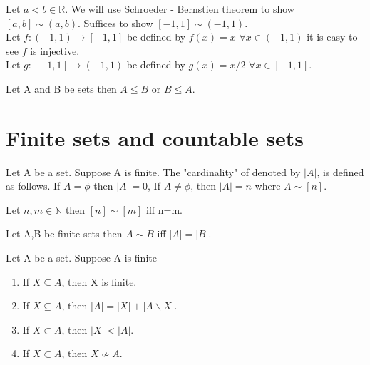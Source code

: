 \documentclass[a4paper,english,12pt]{article}   	%
\begin{document}
\begin{exmp} Let $a<b \in \mathbb{R}$. We will use Schroeder - Bernstien theorem to show $[a,b] \sim (a,b)$. Suffices to show $[-1,1] \sim (-1,1)$.\\
Let $f \colon (-1,1) \to [-1,1]$ be defined by $f(x)=x$ $\forall x \in (-1,1)$ it is easy to see $f$ is injective.\\
Let $g \colon [-1,1] \to (-1,1)$ be defined by $g(x)=x/2$ $\forall x \in [-1,1]$.
\end{exmp}
\begin{thm} Let A and B be sets then $A \leq B $ or $B \leq A$.
\end{thm}

\section{Finite sets and countable sets}
\begin{defn} Let A be a set. Suppose A is finite. The "cardinality" of denoted by $|A|$, is defined as follows. If $A= \phi$ then $|A|=0$, If $A \neq \phi$, then $|A|=n$ where $A \sim [n]$.
\end{defn}
\begin{lem} Let $n,m \in \mathbb{N}$ then $[n] \sim [m]$ iff n=m.
\end{lem}
\begin{cor} Let A,B be finite sets then $A \sim B$ iff $|A|=|B|$.
\end{cor}
\begin{thm} Let A be a set. Suppose A is finite
\begin{enumerate}
\item If $X \subseteq A$, then X is finite.
\item If $X \subseteq A$, then $|A|=|X|+|A\backslash X|$.
\item If $X \subset A$, then $|X|<|A|$.
\item If $X \subset A$, then $X \nsim A$.
\end{enumerate}
\end{thm}
\end{document}
